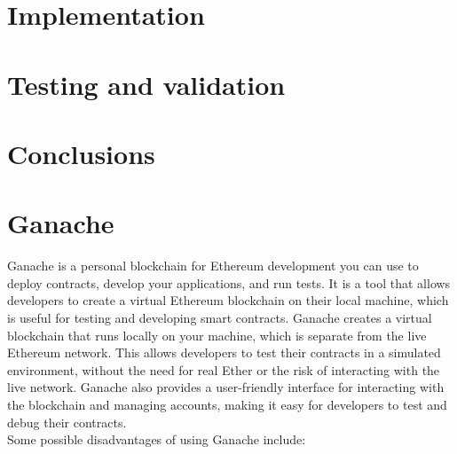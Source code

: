 \documentclass[target=mst,aauheader=]{thud}
\begin{document}
\chapter{Implementation}

\chapter{Testing and validation}

\chapter{Conclusions}

\appendix


\chapter{Ganache}
Ganache is a personal blockchain for Ethereum development you can use to deploy contracts, develop your applications, and run tests. It is a tool that allows developers to create a virtual Ethereum blockchain on their local machine, which is useful for testing and developing smart contracts. Ganache creates a virtual blockchain that runs locally on your machine, which is separate from the live Ethereum network. This allows developers to test their contracts in a simulated environment, without the need for real Ether or the risk of interacting with the live network. Ganache also provides a user-friendly interface for interacting with the blockchain and managing accounts, making it easy for developers to test and debug their contracts.\\

Some possible disadvantages of using Ganache include:
\end{document}
